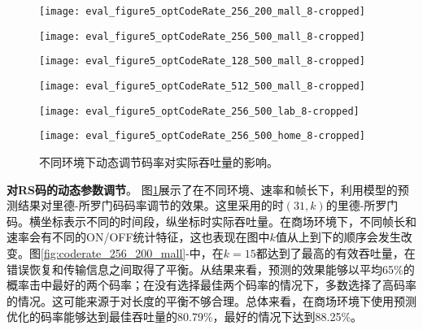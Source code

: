 \begin{figure}[t]
	\begin{minipage}[b]{.32\linewidth}
		\texttt{[image: eval\_figure5\_optCodeRate\_256\_200\_mall\_8-cropped]}
		\label{fig:coderate_256_200_mall}
	\end{minipage}
	\hfill
	\begin{minipage}[b]{.32\linewidth}
		\texttt{[image: eval\_figure5\_optCodeRate\_256\_500\_mall\_8-cropped]}
		\label{fig:coderate_256_500_mall}
	\end{minipage}
	\hfill
	\begin{minipage}[b]{.32\linewidth}
		\texttt{[image: eval\_figure5\_optCodeRate\_128\_500\_mall\_8-cropped]}
		\label{fig:coderate_128_500_mall}
	\end{minipage}

	\begin{minipage}[b]{.32\linewidth}
		\texttt{[image: eval\_figure5\_optCodeRate\_512\_500\_mall\_8-cropped]}
		\label{fig:coderate_512_500_mall}
	\end{minipage}
	\hfill
	\begin{minipage}[b]{.32\linewidth}
		\texttt{[image: eval\_figure5\_optCodeRate\_256\_500\_lab\_8-cropped]}
		\label{fig:coderate_256_200_lab}
	\end{minipage}
	\hfill
	\begin{minipage}[b]{.32\linewidth}
		\texttt{[image: eval\_figure5\_optCodeRate\_256\_500\_home\_8-cropped]}
		\label{fig:coderate_256_200_home}
	\end{minipage}
	\caption{不同环境下动态调节码率对实际吞吐量的影响。}\label{fig:coderate}
\end{figure}
\textbf{对RS码的动态参数调节}。
图\ref{fig:coderate}展示了在不同环境、速率和帧长下，利用模型的预测结果对里德-所罗门码码率调节的效果。这里采用的时$(31, k)$的里德-所罗门码。横坐标表示不同的时间段，纵坐标时实际吞吐量。在商场环境下，不同帧长和速率会有不同的ON/OFF统计特征，这也表现在图中$k$值从上到下的顺序会发生改变。图\ref{fig:coderate_256_200_mall}-中，在$k = 15$都达到了最高的有效吞吐量，在错误恢复和传输信息之间取得了平衡。从结果来看，预测的效果能够以平均65\%的概率击中最好的两个码率；在没有选择最佳两个码率的情况下，多数选择了高码率的情况。这可能来源于对长度的平衡不够合理。总体来看，在商场环境下使用预测优化的码率能够达到最佳吞吐量的80.79\%，最好的情况下达到88.25\%。

